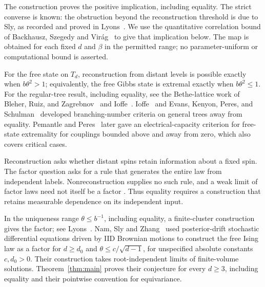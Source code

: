 The construction proves the positive implication, including equality.
The strict converse is known: the obstruction beyond the reconstruction
threshold is due to Sly, as recorded and proved in
Lyons~\cite[Section~3 and Corollary~3.2]{Lyons}. We use the quantitative correlation bound
of Backhausz, Szegedy and Vir\'ag~\cite[Theorem~3.1 in
arXiv:1305.6784v1]{BSV} to give that implication below.
The map is obtained for each fixed $d$ and $\beta$ in the permitted
range; no parameter-uniform or computational bound is asserted.

For the free state on $T_d$, reconstruction from distant levels is
possible exactly when $b\theta^2>1$; equivalently, the free Gibbs state
is extremal exactly when $b\theta^2\le1$. For the regular-tree result,
including equality, see the Bethe-lattice work of Bleher, Ruiz, and
Zagrebnov~\cite{BleherRuizZagrebnov1995} and
Ioffe~\cite{Ioffe1996Bethe}. Ioffe~\cite{Ioffe1996GeneralTrees} and
Evans, Kenyon, Peres, and Schulman~\cite{EvansKenyonPeresSchulman2000}
developed branching-number criteria on general trees away from equality.
Pemantle and Peres~\cite[Theorem~2.1]{PemantlePeres} later gave an
electrical-capacity criterion for free-state extremality for couplings
bounded above and away from zero, which also covers critical cases.

Reconstruction asks whether distant spins retain information about a
fixed spin. The factor question asks for a rule that generates the
entire law from independent labels. Nonreconstruction supplies no such
rule, and a weak limit of factor laws need not itself be a factor
\cite[Corollary~3.3]{Lyons}. Thus equality requires a construction that retains
measurable dependence on its independent input.

In the uniqueness range $\theta\le b^{-1}$, including equality, a
finite-cluster construction gives the factor; see
Lyons~\cite[Section~3]{Lyons}. Nam, Sly and
Zhang~\cite[Theorem~1 and Section~2.2 in arXiv:2012.09484v2]{NSZ}
used posterior-drift stochastic differential equations driven by IID
Brownian motions to construct the free Ising law as a factor for
$d\ge d_0$ and $\theta\le c/\sqrt{d-1}$, for unspecified absolute
constants $c,d_0>0$. Their construction takes root-independent limits
of finite-volume solutions.
Theorem~\ref{thm:main} proves their conjecture for every $d\ge3$,
including equality and their pointwise convention for equivariance.

